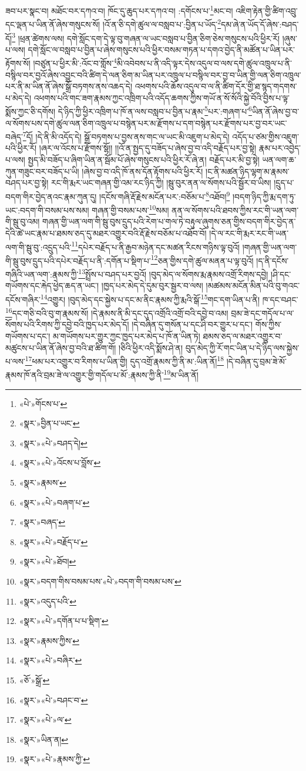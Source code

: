 ཟབ་པར་སྣང་བ། མཐོང་བར་དཀའ་བ། ཁོང་དུ་ཆུད་པར་དཀའ་བ། :དགོངས་པ་\footnote{«པེ་»གོངས་པ་}མང་བ། འཇིག་རྟེན་གྱི་ཚིག་འབྲུ་དང་ལྡན་པ་ཡིན་ནོ་ཞེས་གསུངས་སོ། །འོ་ན་ཅི་དགེ་ཚུལ་ལ་བསླབ་པ་:བྱིན་པ་ཡོད་\footnote{«སྣར་»བྱིན་པ་ཡང་}དམ་ཞེ་ན་ཡོད་དོ་ཞེས་:བཤད་དོ།\footnote{«སྣར་»«པེ་»བཤད་དེ།} །ཕྲན་ཚེགས་ལས། དགེ་སློང་དག་དེ་ལྟ་བུ་གཞན་ལ་ཡང་བསླབ་པ་བྱིན་ཅིག་ཅེས་གསུངས་པའི་ཕྱིར་རོ། །ཞུས་པ་ལས། དགེ་སློང་ལ་བསླབ་པ་བྱིན་པ་ཞེས་གསུངས་པའི་ཕྱིར་བསམ་གཏན་པ་དགའ་བྱེད་ནི་མཚོན་པ་ཡིན་པར་རྟོགས་སོ། །བཙུན་པ་ཕྱིར་མི་:འོང་བ་གློས་\footnote{«སྣར་»«པེ་»འོངས་པ་བློས་}མི་འབེབས་པ་ནི་འདི་ལྟར་དེས་འདུལ་བ་ལས་དགེ་ཚུལ་འཁྲུལ་པ་ནི་བསྙིལ་བར་བྱའོ་ཞེས་འབྱུང་བའི་ཚིག་དེ་ལན་ཅིག་མ་ཡིན་པར་འཁྲུལ་པ་བསྙིལ་བར་བྱ་བ་ཡིན་གྱི་ལན་ཅིག་འཁྲུལ་པར་ནི་མ་ཡིན་ནོ་ཞེས་སྒྲོ་བཏགས་ནས་འཆད་དེ། འཕགས་པའི་ཆོས་འདུལ་བ་ལ་ནི་ཚིག་དོར་གྱི་ཐ་སྙད་གདགས་པ་མེད་དེ། འཕགས་པའི་གང་ཟག་རྣམས་ཀྱང་འཁྲིག་པའི་འདོད་ཆགས་ཀྱིས་གཡོ་ན་སོ་སོའི་སྐྱེ་བོའི་བྱིས་པ་ལྟ་སྨོས་ཀྱང་ཅི་དགོས། དེ་ཉིད་ཀྱི་ཕྱིར་འཁྲིག་པ་ཁོ་ན་ལས་བསླབ་པ་བྱིན་པ་རྣམ་\footnote{«སྣར་»རྣམས་}པར་:གཞག་པ་\footnote{«སྣར་»«པེ་»བཞག་པ་}ཡིན་ནོ་ཞེས་བྱ་བ་ལ་སོགས་པས་དགེ་ཚུལ་ལན་ཅིག་འཁྲུལ་པ་བསྙེན་པར་མ་རྫོགས་པ་དག་བསྙེན་པར་རྫོགས་པར་བྱ་བར་ཡང་བཞེད་\footnote{«སྣར་»བཞད་}དོ། །དེ་ནི་མི་འདོད་དེ། སྒྲོ་བཏགས་པ་བྱས་ནས་གང་ལ་ཡང་མི་འཇུག་པ་མེད་དེ། འདོད་པ་ཙམ་གྱིས་འཇུག་པའི་ཕྱིར་རོ། །ཞར་ལ་འོངས་པ་རྫོགས་སྷོ།། །།འོ་ན་སྤྱད་དུ་བཟོད་པ་ཞེས་བྱ་བ་འདི་བརྗོད་པར་བྱ་སྟེ། རྣམ་པར་འབྱེད་པ་ལས། སྤྱད་མི་བཟོད་པ་ཞིག་ཡིན་ན་སྦོམ་པོ་ཞེས་གསུངས་པའི་ཕྱིར་རོ་ཞེ་ན། བརྗོད་པར་མི་བྱ་སྟེ། ཡན་ལག་ཆ་ཀུན་གཟུང་བར་བཟོད་པ་ཡི། །ཞེས་བྱ་བ་འདི་ཁོ་ནས་དོན་རྟོགས་པའི་ཕྱིར་རོ། །ང་ནི་མཚན་ཉིད་ལྷག་མ་རྣམས་བཤད་པར་བྱ་སྟེ། རང་གི་རྨར་ཡང་གཞན་གྱི་འམ་རང་ཉིད་ཀྱི། །སྦུ་བུར་ནན་ལ་སོགས་པའི་སྦྱོར་བ་ཡིས། །དྲུད་པ་བདག་གིར་བྱེད་ནའང་རྣམ་ཀུན་དུ། །དངོས་གཞི་རྡོ་རྗེས་མངོན་པར་:བཅོམ་པ་\footnote{«སྣར་»«པེ་»བརྗོད་པ་}འཐོབ།\footnote{«སྣར་»«པེ་»ཐོབ།} །བདག་ཉིད་ཀྱི་རྨ་དག་ཏུ་ཡང་:བདག་གི་བསམ་པས་སམ། གཞན་གྱི་བསམ་པས་\footnote{«སྣར་»བདག་གིས་བསམ་པས་«པེ་»བདག་གི་བསམ་པས་}སམ། ནན་ལ་སོགས་པའི་ཐབས་ཀྱིས་རང་གི་ཡན་ལག་གི་སྦུ་བུ་འམ། གཞན་གྱི་ཡན་ལག་གི་སྦུ་བུས་དྲུད་པའི་རེག་པ་གལ་ཏེ་བརྟུལ་ཞུགས་ཅན་གྱིས་བདག་གིར་བྱེད་ན་དེའི་ཚེ་ཡང་རྣམ་པ་ཐམས་ཅད་དུ་མཐར་འགྱུར་བའི་རྡོ་རྗེས་བཅོམ་པ་འཐོབ་བོ། །དེ་ལ་རང་གི་རྨར་རང་གི་ཡན་ལག་གི་སྦུ་བུ་:འདྲུད་པའི་\footnote{«སྣར་»འདུད་པའི་}དཔེར་བརྗོད་པ་ནི་རྒྱབ་མཉེན་དང་མཚན་རིངས་གཉིས་ལྟ་བུའོ། །གཞན་གྱི་ཡན་ལག་གི་སྦུ་བུས་དྲུད་པའི་དཔེར་བརྗོད་པ་ནི་:དགོན་པ་སྡིག་པ་\footnote{«སྣར་»«པེ་»དགོན་པ་པ་སྡིག་}ཅན་གྱིས་དགེ་ཚུལ་མནན་པ་ལྟ་བུའོ། །ད་ནི་དངོས་གཞིའི་ཡན་ལག་:རྣམས་ཀྱི་\footnote{«སྣར་»རྣམས་ཀྱིས་}སྤྲོས་པ་བཤད་པར་བྱའོ། །བུད་མེད་ལ་སོགས་རྨ་རྣམས་འགྲོ་རིགས་དབྱེ། །ཤི་དང་གཡོགས་དང་རྐེད་ཕྱེད་ཆད་ན་ཡང་། །ཁྱད་པར་མེད་དེ་དུམ་བུར་སྦྱར་བ་ལས། །མཚམས་མངོན་མིན་པའི་བུ་གའང་དངོས་གཞིར་\footnote{«སྣར་»«པེ་»བཞིར་}འགྱུར། །བུད་མེད་དང་སྐྱེས་པ་དང་མ་ནིང་རྣམས་ཀྱི་རྨའི་སྒོ་\footnote{«ཅོ་»སྒྲོ་}གང་དག་ཡིན་པ་ནི། ཁ་དང་བཤང་\footnote{«སྣར་»«པེ་»བཤང་བ་}དང་གཅི་བའི་བུ་ག་རྣམས་སོ། །དེ་རྣམས་ནི་མི་དང་དུད་འགྲོའི་འགྲོ་བའི་དབྱེ་བ་འམ། བྲམ་ཟེ་དང་གདོལ་པ་ལ་སོགས་པའི་རིགས་ཀྱི་དབྱེ་བའི་ཁྱད་པར་མེད་དོ། །དེ་བཞིན་དུ་གསོན་པ་དང་ཤི་བར་གྱུར་པ་དང་། གོས་ཀྱིས་གཡོགས་པ་དང་། མ་གཡོགས་པར་གྱུར་ཀྱང་ཁྱད་པར་མེད་པ་ཁོ་ན་ཡིན་ཏེ། ཐམས་ཅད་ལ་མཐར་འགྱུར་བ་མཚུངས་པ་ཡིན་ནོ་ཞེས་བྱ་བའི་ཐ་ཚིག་གོ། །ཅིའི་ཕྱིར་འདི་སྨོས་ཤེ་ན། བུད་མེད་ཀྱི་རོ་གང་ཡིན་པ་དེ་ཉིད་ལས་སྐྱེས་པ་ལས་\footnote{«སྣར་»«པེ་»ལ་}ཕམ་པར་འགྱུར་བ་རིགས་པ་ཡིན་གྱི། དུད་འགྲོ་རྣམས་ཀྱི་ནི་མ་:ཡིན་ནོ།\footnote{«སྣར་»ཡིན་ན།} །དེ་བཞིན་དུ་བྲམ་ཟེ་མོ་རྣམས་ཁོ་ནའི་བྲམ་ཟེ་ལ་འགྱུར་གྱི་གདོལ་པ་མོ་:རྣམས་ཀྱི་ནི་\footnote{«སྣར་»«པེ་»རྣམས་ཀྱི་}མ་ཡིན་ནོ། 